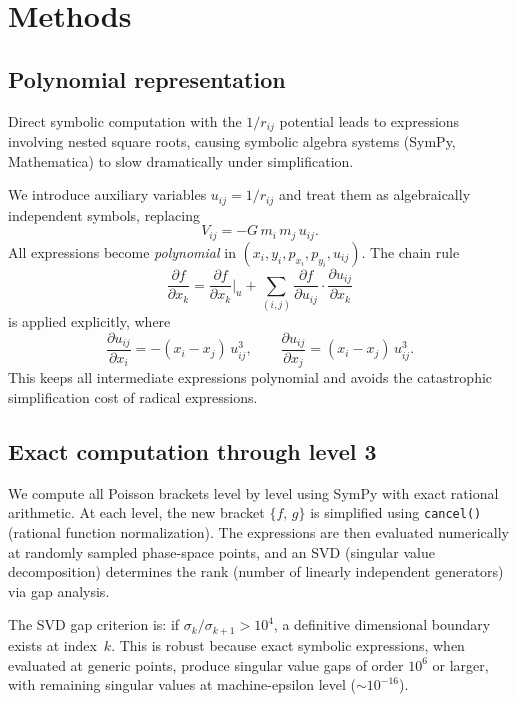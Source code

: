 \documentclass[11pt,a4paper]{article}
\theoremstyle{remark}
\newcommand{\pb}[2]{\{#1,\,#2\}}
\begin{document}
\section{Methods}

\subsection{Polynomial representation}

Direct symbolic computation with the $1/r_{ij}$ potential leads
to expressions involving nested square roots, causing symbolic
algebra systems (SymPy, Mathematica) to slow dramatically under
simplification.

We introduce auxiliary variables $u_{ij} = 1/r_{ij}$ and treat
them as algebraically independent symbols, replacing
\[
  V_{ij} = -G\,m_i\,m_j\, u_{ij}.
\]
All expressions become \emph{polynomial} in
$(x_i, y_i, p_{x_i}, p_{y_i}, u_{ij})$.  The chain rule
\[
  \frac{\partial f}{\partial x_k}
  = \frac{\partial f}{\partial x_k}\bigg|_{u}
  + \sum_{(i,j)} \frac{\partial f}{\partial u_{ij}}
    \cdot \frac{\partial u_{ij}}{\partial x_k}
\]
is applied explicitly, where
\[
  \frac{\partial u_{ij}}{\partial x_i}
  = -(x_i - x_j)\,u_{ij}^3, \qquad
  \frac{\partial u_{ij}}{\partial x_j}
  = (x_i - x_j)\,u_{ij}^3.
\]
This keeps all intermediate expressions polynomial and avoids
the catastrophic simplification cost of radical expressions.

\subsection{Exact computation through level 3}

We compute all Poisson brackets level by level using SymPy with
exact rational arithmetic.  At each level, the new bracket
$\pb{f}{g}$ is simplified using \texttt{cancel()} (rational
function normalization).  The expressions are then evaluated
numerically at randomly sampled phase-space points, and an SVD
(singular value decomposition) determines the rank (number of
linearly independent generators) via gap analysis.

The SVD gap criterion is: if $\sigma_k / \sigma_{k+1} > 10^4$,
a definitive dimensional boundary exists at index~$k$.  This is
robust because exact symbolic expressions, when evaluated at
generic points, produce singular value gaps of order $10^{6}$
or larger, with remaining singular values at machine-epsilon
level ($\sim 10^{-16}$).
\end{document}
